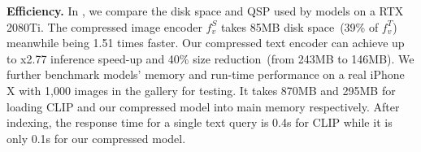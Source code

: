\textbf{Efficiency.} In , we compare the disk space and QSP used by models on a RTX 2080Ti. The compressed image encoder $f_v^{S}$ takes 85MB disk space~(39\% of $f_v^{T}$) meanwhile being 1.51 times faster. Our compressed text encoder can achieve up to x2.77 inference speed-up and 40\% size reduction~(from 243MB to 146MB). We further benchmark models'  memory and run-time performance on a real iPhone X with 1,000 images in the gallery for testing. It takes 870MB and 295MB for loading CLIP and our compressed model into main memory respectively. After indexing, the response time for a single text query is 0.4s for CLIP while it is only 0.1s for our compressed model.



